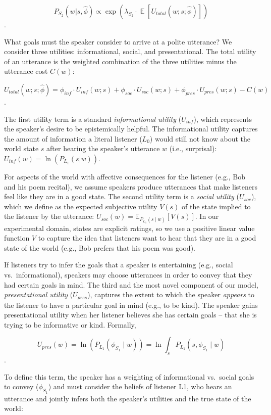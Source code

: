 \documentclass[floatsintext,man]{apa6}
\theoremstyle{definition}
\theoremstyle{definition}
\theoremstyle{definition}
\theoremstyle{remark}
\begin{document}
\[P_{S_2}(w | s, \hat{\phi}) \propto \exp(\lambda_{S_2} \cdot \mathop{\mathbb{E}}[U_{total}(w; s; \hat{\phi})])\].

What goals must the speaker consider to arrive at a polite utterance? We
consider three utilities: informational, social, and presentational. The
total utility of an utterance is the weighted combination of the three
utilities minus the utterance cost \(C(w)\):

\[U_{total}(w; s; \hat{\phi}) = \phi_{inf} \cdot U_{inf}(w; s) + \phi_{soc} \cdot U_{soc}(w; s) + \phi_{pres} \cdot U_{pres}(w; s) - C(w)\].

The first utility term is a standard \emph{informational utility}
(\(U_{inf}\)), which represents the speaker's desire to be epistemically
helpful. The informational utility captures the amount of information a
literal listener (\(L_0\)) would still not know about the world state
\(s\) after hearing the speaker's utterance \(w\) (i.e., surprisal):
\(U_{inf}(w) = \ln(P_{L_1}(s | w))\).

For aspects of the world with affective consequences for the listener
(e.g., Bob and his poem recital), we assume speakers produce utterances
that make listeners feel like they are in a good state. The second
utility term is a \emph{social utility} (\(U_{soc}\)), which we define
as the expected subjective utility \(V(s)\) of the state implied to the
listener by the utterance:
\(U_{soc}(w) = \mathbb{E}_{P_{L_1}(s \mid w)}[V(s)]\). In our
experimental domain, states are explicit ratings, so we use a positive
linear value function \(V\) to capture the idea that listeners want to
hear that they are in a good state of the world (e.g., Bob prefers that
his poem was good).

If listeners try to infer the goals that a speaker is entertaining
(e.g., social vs.~informational), speakers may choose utterances in
order to convey that they had certain goals in mind. The third and the
most novel component of our model, \emph{presentational utility}
(\(U_{pres}\)), captures the extent to which the speaker \emph{appears}
to the listener to have a particular goal in mind (e.g., to be kind).
The speaker gains presentational utility when her listener believes she
has certain goals -- that she is trying to be informative or kind.
Formally,

\[U_{pres}(w) = \ln(P_{L_1}(\phi_{S_1} \mid w)) = \ln \int_s P_{L_1}(s, \phi_{S_1} \mid w)\].

To define this term, the speaker has a weighting of informational
vs.~social goals to convey (\(\phi_{S_1}\)) and must consider the
beliefs of listener L1, who hears an utterance and jointly infers both
the speaker's utilities and the true state of the world:
\end{document}
